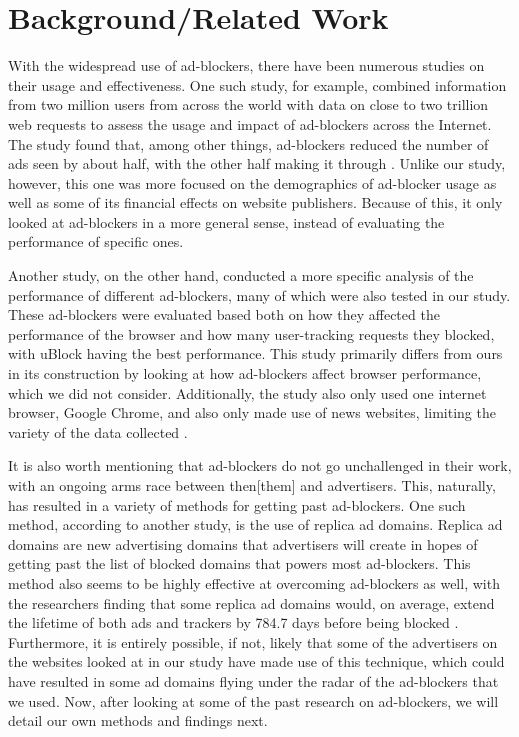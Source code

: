 \documentclass[sigsmall]{acmart}
\begin{document}
\section*{Background/Related Work}
With the widespread use of ad-blockers, there have been numerous studies on their usage and effectiveness. One such study, for example, combined information from two million users from across the world with data on close to two trillion web requests to assess the usage and impact of ad-blockers across the Internet. The study found that, among other things, ad-blockers reduced the number of ads seen by about half, with the other half making it through \cite{10.1145/2987443.2987460}. Unlike our study, however, this one was more focused on the demographics of ad-blocker usage as well as some of its financial effects on website publishers. Because of this, it only looked at ad-blockers in a more general sense, instead of evaluating the performance of specific ones.

Another study, on the other hand, conducted a more specific analysis of the performance of different ad-blockers, many of which were also tested in our study. These ad-blockers were evaluated based both on how they affected the performance of the browser and how many user-tracking requests they blocked, with uBlock having the best performance. This study primarily differs from ours in its construction by looking at how ad-blockers affect browser performance, which we did not consider. Additionally, the study also only used one internet browser, Google Chrome, and also only made use of news websites, limiting the variety of the data collected \cite{10.1145/3091478.3091514}.

It is also worth mentioning that ad-blockers do not go unchallenged in their work, with an ongoing arms race between then[them] and advertisers. This, naturally, has resulted in a variety of methods for getting past ad-blockers. One such method, according to another study, is the use of replica ad domains. Replica ad domains are new advertising domains that advertisers will create in hopes of getting past the list of blocked domains that powers most ad-blockers. This method also seems to be highly effective at overcoming ad-blockers as well, with the researchers finding that some replica ad domains would, on average, extend the lifetime of both ads and trackers by 784.7 days before being blocked \cite{10.1145/3485447.3512218}. Furthermore, it is entirely possible, if not, likely that some of the advertisers on the websites looked at in our study have made use of this technique, which could have resulted in some ad domains flying under the radar of the ad-blockers that we used. Now, after looking at some of the past research on ad-blockers, we will detail our own methods and findings next.
\end{document}
